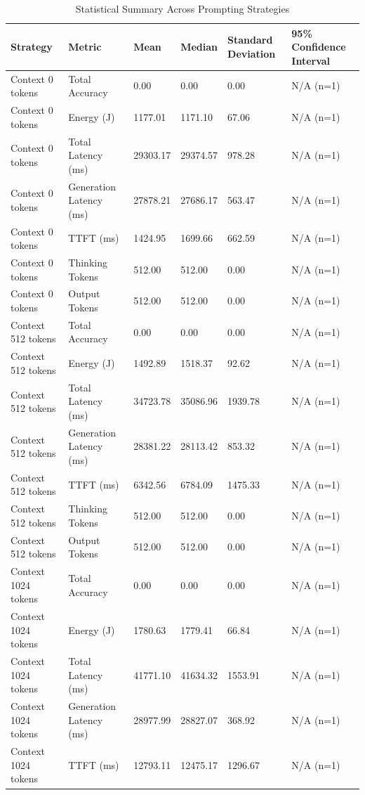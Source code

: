 \begin{table}
\caption{Statistical Summary Across Prompting Strategies}
\label{tab:statistical_summary}
\begin{tabular}{llllll}
\toprule
Strategy & Metric & Mean & Median & Standard Deviation & 95\% Confidence Interval \\
\midrule
Context 0 tokens & Total Accuracy & 0.00 & 0.00 & 0.00 & N/A (n=1) \\
Context 0 tokens & Energy (J) & 1177.01 & 1171.10 & 67.06 & N/A (n=1) \\
Context 0 tokens & Total Latency (ms) & 29303.17 & 29374.57 & 978.28 & N/A (n=1) \\
Context 0 tokens & Generation Latency (ms) & 27878.21 & 27686.17 & 563.47 & N/A (n=1) \\
Context 0 tokens & TTFT (ms) & 1424.95 & 1699.66 & 662.59 & N/A (n=1) \\
Context 0 tokens & Thinking Tokens & 512.00 & 512.00 & 0.00 & N/A (n=1) \\
Context 0 tokens & Output Tokens & 512.00 & 512.00 & 0.00 & N/A (n=1) \\
Context 512 tokens & Total Accuracy & 0.00 & 0.00 & 0.00 & N/A (n=1) \\
Context 512 tokens & Energy (J) & 1492.89 & 1518.37 & 92.62 & N/A (n=1) \\
Context 512 tokens & Total Latency (ms) & 34723.78 & 35086.96 & 1939.78 & N/A (n=1) \\
Context 512 tokens & Generation Latency (ms) & 28381.22 & 28113.42 & 853.32 & N/A (n=1) \\
Context 512 tokens & TTFT (ms) & 6342.56 & 6784.09 & 1475.33 & N/A (n=1) \\
Context 512 tokens & Thinking Tokens & 512.00 & 512.00 & 0.00 & N/A (n=1) \\
Context 512 tokens & Output Tokens & 512.00 & 512.00 & 0.00 & N/A (n=1) \\
Context 1024 tokens & Total Accuracy & 0.00 & 0.00 & 0.00 & N/A (n=1) \\
Context 1024 tokens & Energy (J) & 1780.63 & 1779.41 & 66.84 & N/A (n=1) \\
Context 1024 tokens & Total Latency (ms) & 41771.10 & 41634.32 & 1553.91 & N/A (n=1) \\
Context 1024 tokens & Generation Latency (ms) & 28977.99 & 28827.07 & 368.92 & N/A (n=1) \\
Context 1024 tokens & TTFT (ms) & 12793.11 & 12475.17 & 1296.67 & N/A (n=1) \\

\end{tabular}
\end{table}

